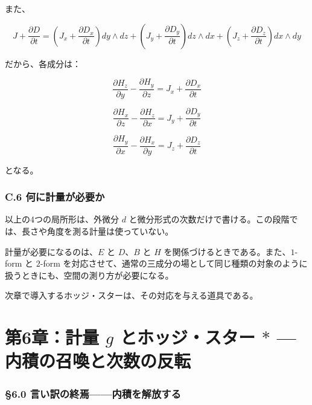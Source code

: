 \documentclass[a4paper,12pt,openany]{book}
\begin{document}
また、

\[J+\frac{\partial D}{\partial t} = \left(J_x+\frac{\partial D_x}{\partial t}\right)dy\wedge dz + \left(J_y+\frac{\partial D_y}{\partial t}\right)dz\wedge dx + \left(J_z+\frac{\partial D_z}{\partial t}\right)dx\wedge dy\]

だから、各成分は：

\[
\frac{\partial H_z}{\partial y}
-
\frac{\partial H_y}{\partial z}
=
J_x+\frac{\partial D_x}{\partial t}
\]

\[
\frac{\partial H_x}{\partial z}
-
\frac{\partial H_z}{\partial x}
=
J_y+\frac{\partial D_y}{\partial t}
\]

\[
\frac{\partial H_y}{\partial x}
-
\frac{\partial H_x}{\partial y}
=
J_z+\frac{\partial D_z}{\partial t}
\]

となる。

\hypertarget{c.6-ux4f55ux306bux8a08ux91cfux304cux5fc5ux8981ux304b}{%
\subsection*{C.6
何に計量が必要か}\label{c.6-ux4f55ux306bux8a08ux91cfux304cux5fc5ux8981ux304b}}

以上の4つの局所形は、外微分 \(d\)
と微分形式の次数だけで書ける。この段階では、長さや角度を測る計量は使っていない。

計量が必要になるのは、\(E\) と \(D\)、\(B\) と \(H\)
を関係づけるときである。また、\(1\)-form と \(2\)-form
を対応させて、通常の三成分の場として同じ種類の対象のように扱うときにも、空間の測り方が必要になる。

次章で導入するホッジ・スターは、その対応を与える道具である。

\newpage

\hypertarget{ux7b2c6ux7ae0ux8a08ux91cf-g-ux3068ux30dbux30c3ux30b8ux30b9ux30bfux30fc-ast-ux5185ux7a4dux306eux53ecux559aux3068ux6b21ux6570ux306eux53cdux8ee2}{%
\chapter{\texorpdfstring{第6章：計量 \(g\) とホッジ・スター \(\ast\) —
内積の召喚と次数の反転}{第6章：計量 g とホッジ・スター \textbackslash ast — 内積の召喚と次数の反転}}\label{ux7b2c6ux7ae0ux8a08ux91cf-g-ux3068ux30dbux30c3ux30b8ux30b9ux30bfux30fc-ast-ux5185ux7a4dux306eux53ecux559aux3068ux6b21ux6570ux306eux53cdux8ee2}}

\hypertarget{ux8a00ux3044ux8a33ux306eux7d42ux7109ux5185ux7a4dux3092ux89e3ux653eux3059ux308b}{%
\subsection{§6.0
言い訳の終焉——内積を解放する}\label{ux8a00ux3044ux8a33ux306eux7d42ux7109ux5185ux7a4dux3092ux89e3ux653eux3059ux308b}}
\end{document}
